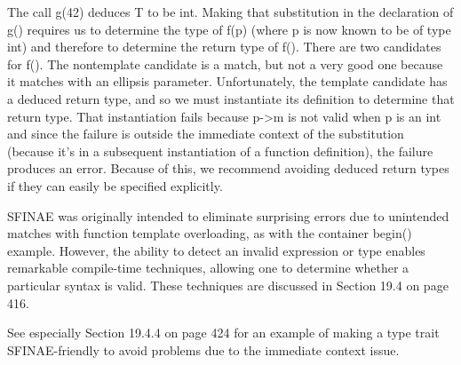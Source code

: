 The call g(42) deduces T to be int. Making that substitution in the declaration of g() requires us to determine the type of f(p) (where p is now known to be of type int) and therefore to determine the return type of f(). There are two candidates for f(). The nontemplate candidate is a match, but not a very good one because it matches with an ellipsis parameter. Unfortunately, the template candidate has a deduced return type, and so we must instantiate its definition to determine that return type. That instantiation fails because p->m is not valid when p is an int and since the failure is outside the immediate context of the substitution (because it’s in a subsequent instantiation of a function definition), the failure produces an error. Because of this, we recommend avoiding deduced return types if they can easily be specified explicitly.

SFINAE was originally intended to eliminate surprising errors due to unintended matches with function template overloading, as with the container begin() example. However, the ability to detect an invalid expression or type enables remarkable compile-time techniques, allowing one to determine whether a particular syntax is valid. These techniques are discussed in Section 19.4 on page 416.

See especially Section 19.4.4 on page 424 for an example of making a type trait SFINAE-friendly to avoid problems due to the immediate context issue.




